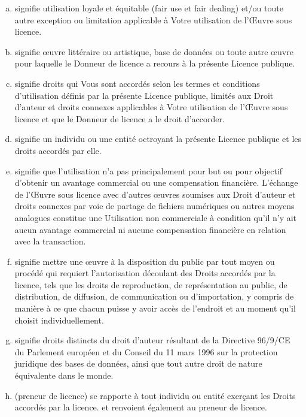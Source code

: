 \begin{enumerate}[a.]
\item {} signifie utilisation loyale et équitable (fair use et fair dealing) et/ou toute autre exception ou limitation applicable à Votre utilisation de l’Œuvre sous licence.
\item {} signifie œuvre littéraire ou artistique, base de données ou toute autre œuvre pour laquelle le Donneur de licence a recours à la présente Licence publique.
\item {} signifie droits qui Vous sont accordés selon les termes et conditions d’utilisation définis par la présente Licence publique, limités aux Droit d’auteur et droits connexes applicables à Votre utilisation de l’Œuvre sous licence et que le Donneur de licence a le droit d’accorder.
\item {} signifie un individu ou une entité octroyant la présente Licence publique et les droits accordés par elle.
\item {} signifie que l’utilisation n’a pas principalement pour but ou pour objectif d'obtenir un avantage commercial ou une compensation financière. L’échange de l’Œuvre sous licence avec d’autres œuvres soumises aux Droit d’auteur et droits connexes par voie de partage de fichiers numériques ou autres moyens analogues constitue une Utilisation non commerciale à condition qu’il n’y ait aucun avantage commercial ni aucune compensation financière en relation avec la transaction.
\item {} signifie mettre une œuvre à la disposition du public par tout moyen ou procédé qui requiert l’autorisation découlant des Droits accordés par la licence, tels que les droits de reproduction, de représentation au public, de distribution, de diffusion, de communication ou d’importation, y compris de manière à ce que chacun puisse y avoir accès de l’endroit et au moment qu’il choisit individuellement.
\item {} signifie droits distincts du droit d'auteur résultant de la Directive 96/9/CE du Parlement européen et du Conseil du 11 mars 1996 sur la protection juridique des bases de données, ainsi que tout autre droit de nature équivalente dans le monde.
\item {} (preneur de licence) se rapporte à tout individu ou entité exerçant les Droits accordés par la licence.  et  renvoient également au preneur de licence.
\end{enumerate}


